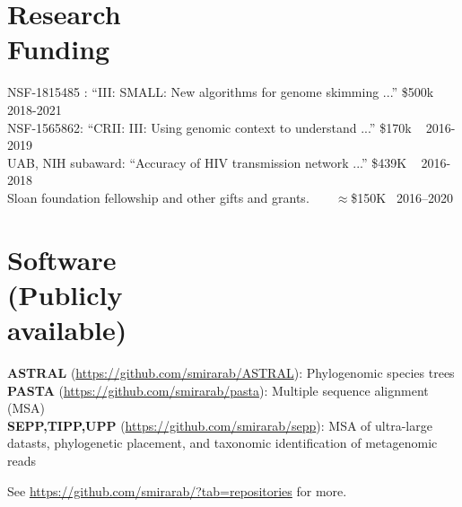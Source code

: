 \documentclass[margin,line,letterpaper]{resume}
\begin{document}
\begin{resume}
\begin{small}
    \section{\mysidestyle Research\\Funding}
      NSF-1815485 :  ``III: SMALL: New algorithms for genome skimming ...''
 \hfill \$500k ~
 \hfill 2018-2021\\
 NSF-1565862:  ``CRII: III: Using genomic context to understand ...''
 \hfill  \$170k ~
 \hfill 2016-2019\\
 UAB, NIH subaward:  ``Accuracy of HIV transmission network ...''
 \hfill  \$439K ~
 \hfill 2016-2018\\
 Sloan foundation fellowship and other gifts and grants. 
 \hfill  ~ \hfill \hfill ~  \hfill $\approx$\$150K  \hfill  ~2016--2020
 
 \section{\mysidestyle Software\\(Publicly\\available)}
\textbf{ASTRAL} (\url{https://github.com/smirarab/ASTRAL}):
Phylogenomic species trees\vspace{1mm}\\
\textbf{PASTA} (\url{https://github.com/smirarab/pasta}): 
Multiple sequence alignment (MSA)\vspace{1mm}\\
\textbf{SEPP,TIPP,UPP} (\url{https://github.com/smirarab/sepp}):
MSA of ultra-large datasts, phylogenetic placement, and taxonomic identification of metagenomic reads

See \url{https://github.com/smirarab/?tab=repositories} for more. 
 

\end{small}
\end{resume}
\end{document}
